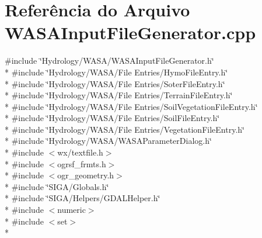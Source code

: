 \section{Referência do Arquivo W\+A\+S\+A\+Input\+File\+Generator.\+cpp}
\label{_w_a_s_a_input_file_generator_8cpp}
{\ttfamily \#include \char`\"{}Hydrology/\+W\+A\+S\+A/\+W\+A\+S\+A\+Input\+File\+Generator.\+h\char`\"{}}\\*
{\ttfamily \#include \char`\"{}Hydrology/\+W\+A\+S\+A/\+File Entries/\+Hymo\+File\+Entry.\+h\char`\"{}}\\*
{\ttfamily \#include \char`\"{}Hydrology/\+W\+A\+S\+A/\+File Entries/\+Soter\+File\+Entry.\+h\char`\"{}}\\*
{\ttfamily \#include \char`\"{}Hydrology/\+W\+A\+S\+A/\+File Entries/\+Terrain\+File\+Entry.\+h\char`\"{}}\\*
{\ttfamily \#include \char`\"{}Hydrology/\+W\+A\+S\+A/\+File Entries/\+Soil\+Vegetation\+File\+Entry.\+h\char`\"{}}\\*
{\ttfamily \#include \char`\"{}Hydrology/\+W\+A\+S\+A/\+File Entries/\+Soil\+File\+Entry.\+h\char`\"{}}\\*
{\ttfamily \#include \char`\"{}Hydrology/\+W\+A\+S\+A/\+File Entries/\+Vegetation\+File\+Entry.\+h\char`\"{}}\\*
{\ttfamily \#include \char`\"{}Hydrology/\+W\+A\+S\+A/\+W\+A\+S\+A\+Parameter\+Dialog.\+h\char`\"{}}\\*
{\ttfamily \#include $<$wx/textfile.\+h$>$}\\*
{\ttfamily \#include $<$ogrsf\+\_\+frmts.\+h$>$}\\*
{\ttfamily \#include $<$ogr\+\_\+geometry.\+h$>$}\\*
{\ttfamily \#include \char`\"{}S\+I\+G\+A/\+Globals.\+h\char`\"{}}\\*
{\ttfamily \#include \char`\"{}S\+I\+G\+A/\+Helpers/\+G\+D\+A\+L\+Helper.\+h\char`\"{}}\\*
{\ttfamily \#include $<$numeric$>$}\\*
{\ttfamily \#include $<$set$>$}\\*
